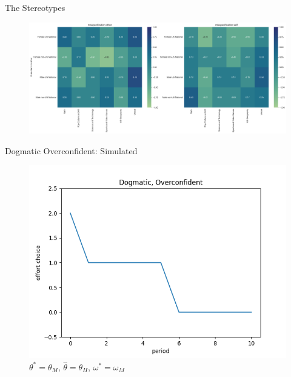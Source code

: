 \documentclass[aspectratio=169]{beamer}
\begin{document}
\begin{frame}{The Stereotypes}
    \label{stereotypes}
    \begin{figure}
        \centering
        \includegraphics[scale=.3]{misspecifications_characteristics_treatment.png}
    \end{figure}


\end{frame}

\begin{frame}{Dogmatic Overconfident: Simulated}
    
    \begin{figure}
        \centering
        \includegraphics[scale=.5]{dogmatic_over_11.png}
        \caption{$\theta^*=\theta_M$, $\hat\theta=\theta_H$, $\omega^*=\omega_M$}
    \end{figure}

    \label{dogmaticpath}
\end{frame}
\end{document}
